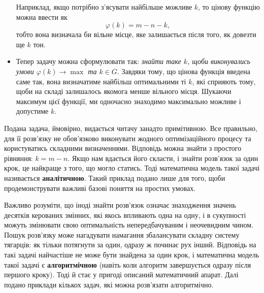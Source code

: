 \documentclass[../book.tex]{subfiles}
\begin{document}
\begin{itemize}
 Наприклад, якщо потрібно з'ясувати найбільше можливе $k$, то цінову функцію можна ввести як $$ \varphi(k) = m-n-k, $$ тобто вона визначала би вільне місце, яке залишається після того, як довезти ще $k$ тон.
 
 \item
 
 Тепер задачу можна сформулювати так: \textit{знайти таке $k$, щоби виконувались умови $\varphi(k) \rightarrow \max$ та $k \in G$}. Завдяки тому, що цінова функція введена саме так, вона визначатиме найбільш оптимальними ті $k$, які сприяють тому, щоби на складі залишалось якомога менше вільного місця. Шукаючи максимум цієї функції, ми одночасно знаходимо максимально можливе і допустиме $k$.

\end{itemize}

Подана задача, ймовірно, видається читачу занадто примітивною. Все правильно, для її розв'язку не обов'язково виконувати жодного оптимізаційного процесу та користуватись складними визначеннями. Відповідь можна знайти з простого рівняння: $k = m - n$. Якщо нам вдається його скласти, і знайти розв'язок за один крок, це найкраще з того, що могло статись. Тоді математична модель такої задачі називається \textbf{аналітичною}. Такий приклад подано лише для того, щоби продемонструвати важливі базові поняття на простих умовах.

Важливо розуміти, що іноді \flqq{}знайти розв'язок\frqq{} означає знаходження значень десятків керованих змінних, які якось впливають одна на одну, і в сукупності можуть змінювати свою оптимальність непередбачуваним і неочевидним чином. Пошук розв'язку може нагадувати намагання збалансувати складну систему тягарців: як тільки потягнути за один, одразу ж починає рух інший. Відповідь на такі задачі найчастіше не може бути знайдена за один крок, і математична модель такої задачі є \textbf{алгоритмічною} (навіть коли алгоритм завершується одразу після першого кроку). Тоді й стає у пригоді описаний математичний апарат. Далі подано приклади кількох задач, які можна розв'язати алгоритмічно.
\end{document}
